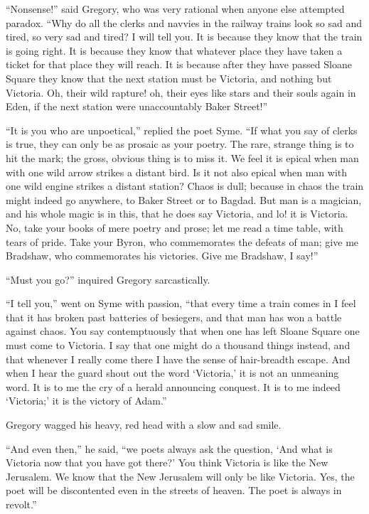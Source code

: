 \documentclass{book}
\begin{document}
“Nonsense!” said Gregory, who was very rational when anyone else attempted paradox. “Why do all the clerks and navvies in the railway trains look so sad and tired, so very sad and tired? I will tell you. It is because they know that the train is going right. It is because they know that whatever place they have taken a ticket for that place they will reach. It is because after they have passed Sloane Square they know that the next station must be Victoria, and nothing but Victoria. Oh, their wild rapture! oh, their eyes like stars and their souls again in Eden, if the next station were unaccountably Baker Street!”

“It is you who are unpoetical,” replied the poet Syme. “If what you say of clerks is true, they can only be as prosaic as your poetry. The rare, strange thing is to hit the mark; the gross, obvious thing is to miss it. We feel it is epical when man with one wild arrow strikes a distant bird. Is it not also epical when man with one wild engine strikes a distant station? Chaos is dull; because in chaos the train might indeed go anywhere, to Baker Street or to Bagdad. But man is a magician, and his whole magic is in this, that he does say Victoria, and lo! it is Victoria. No, take your books of mere poetry and prose; let me read a time table, with tears of pride. Take your Byron, who commemorates the defeats of man; give me Bradshaw, who commemorates his victories. Give me Bradshaw, I say!”

“Must you go?” inquired Gregory sarcastically.

“I tell you,” went on Syme with passion, “that every time a train comes in I feel that it has broken past batteries of besiegers, and that man has won a battle against chaos. You say contemptuously that when one has left Sloane Square one must come to Victoria. I say that one might do a thousand things instead, and that whenever I really come there I have the sense of hair-breadth escape. And when I hear the guard shout out the word ‘Victoria,’ it is not an unmeaning word. It is to me the cry of a herald announcing conquest. It is to me indeed ‘Victoria;’ it is the victory of Adam.”

Gregory wagged his heavy, red head with a slow and sad smile.

“And even then,” he said, “we poets always ask the question, ‘And what is Victoria now that you have got there?’ You think Victoria is like the New Jerusalem. We know that the New Jerusalem will only be like Victoria. Yes, the poet will be discontented even in the streets of heaven. The poet is always in revolt.”
\end{document}
